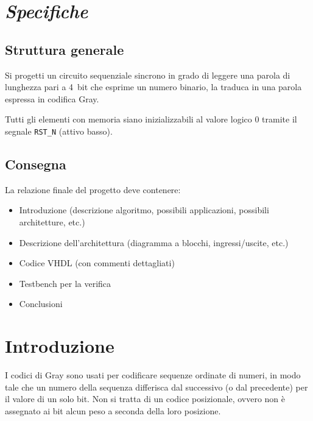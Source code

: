 \documentclass[a4paper,11pt,twoside]{article}
\title{\emph{Transcodificatore Gray-Binary}\texorpdfstring{\\}{}\vskip2ex
       \Large Progetto di Apparati Elettronici}
\author{Antonio Macrì}
\newcommand\code{\lstinline[basicstyle=\normalsize\ttfamily]}
\begin{document}
\maketitle
{}
\tableofcontents
{}
\null
\clearpage



\section{\textsl{Specifiche}}

\begingroup
\slshape

\subsection{Struttura generale}

Si progetti un circuito sequenziale sincrono in grado di leggere una parola di lunghezza pari a 4~bit che esprime un numero binario, la traduca in una parola espressa in codifica Gray.

Tutti gli elementi con memoria siano inizializzabili al valore logico 0 tramite il segnale \code|RST_N| (attivo basso).

\subsection{Consegna}
La relazione finale del progetto deve contenere:
\begin{itemize}
\item Introduzione (descrizione algoritmo, possibili applicazioni, possibili architetture, etc.)
\item Descrizione dell’architettura (diagramma a blocchi, ingressi/uscite, etc.)
\item Codice VHDL (con commenti dettagliati)
\item Testbench per la verifica
\item Conclusioni
\end{itemize}

\endgroup


\section{Introduzione}

I codici di Gray sono usati per codificare sequenze ordinate di numeri, in modo tale che un numero della sequenza differisca dal successivo (o dal precedente) per il valore di un solo bit. Non si tratta di un codice posizionale, ovvero non è assegnato ai bit alcun peso a seconda della loro posizione.
\end{document}
